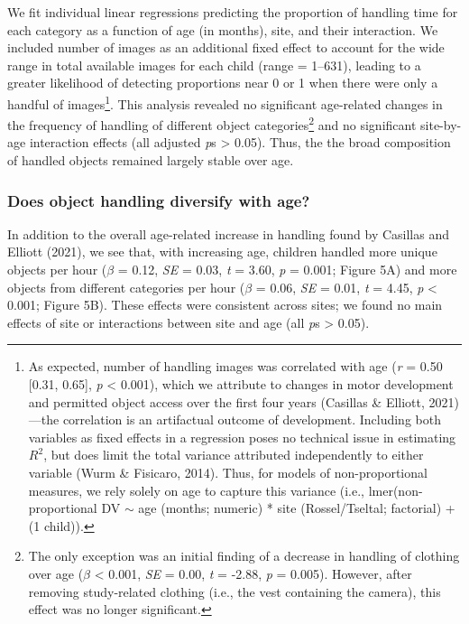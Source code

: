 \documentclass[10pt, letterpaper]{article}
\begin{document}
We fit individual linear regressions predicting the proportion of
handling time for each category as a function of age (in months), site,
and their interaction. We included number of images as an additional
fixed effect to account for the wide range in total available images for
each child (range = 1--631), leading to a greater likelihood of
detecting proportions near 0 or 1 when there were only a handful of
images\footnote{As expected, number of handling images was correlated
  with age (\emph{r} = 0.50 {[}0.31, 0.65{]}, \emph{p} \textless{}
  0.001), which we attribute to changes in motor development and
  permitted object access over the first four years (Casillas \&
  Elliott, 2021)---the correlation is an artifactual outcome of
  development. Including both variables as fixed effects in a regression
  poses no technical issue in estimating \(R^{2}\), but does limit the
  total variance attributed independently to either variable (Wurm \&
  Fisicaro, 2014). Thus, for models of non-proportional measures, we
  rely solely on age to capture this variance (i.e.,
  lmer(non-proportional DV \({\sim}\) age (months; numeric) * site
  (Rossel/Tseltal; factorial) + (1 \textbar{} child)).}. This analysis
revealed no significant age-related changes in the frequency of handling
of different object categories\footnote{The only exception was an
  initial finding of a decrease in handling of clothing over age
  (\(\beta\) \textless{} 0.001, \emph{SE} = 0.00, \emph{t} = -2.88,
  \emph{p} = 0.005). However, after removing study-related clothing
  (i.e., the vest containing the camera), this effect was no longer
  significant.} and no significant site-by-age interaction effects (all
adjusted \emph{p}s \textgreater{} 0.05). Thus, the the broad composition
of handled objects remained largely stable over age.

\hypertarget{does-object-handling-diversify-with-age}{%
\subsubsection{Does object handling diversify with
age?}\label{does-object-handling-diversify-with-age}}

In addition to the overall age-related increase in handling found by
Casillas and Elliott (2021), we see that, with increasing age, children
handled more unique objects per hour (\(\beta\) = 0.12, \emph{SE} =
0.03, \emph{t} = 3.60, \emph{p} = 0.001; Figure 5A) and more objects
from different categories per hour (\(\beta\) = 0.06, \emph{SE} = 0.01,
\emph{t} = 4.45, \emph{p} \textless{} 0.001; Figure 5B). These effects
were consistent across sites; we found no main effects of site or
interactions between site and age (all \emph{p}s \textgreater{} 0.05).
\end{document}
